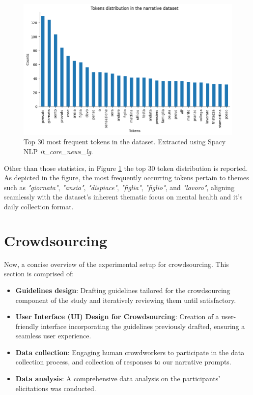 \begin{figure}[!htbp]
    \centering
    \includegraphics[width=1\linewidth]{assets//imgs/dataset-top-30-prompt.png}
    \caption{Top 30 most frequent tokens in the dataset. Extracted using Spacy NLP \textit{it\_core\_news\_lg}.}
    \label{fig:dataset-top-30-prompt}
\end{figure}

Other than those statistics, in Figure \ref{fig:dataset-top-30-prompt} the top 30 token distribution is reported. As depicted in the figure, the most frequently occurring tokens pertain to themes such as  \emph{"giornata"}, \emph{"ansia"},  \emph{"dispiace"},  \emph{"figlia"},  \emph{"figlio"}, and  \emph{"lavoro"}, aligning seamlessly with the dataset's inherent thematic focus on mental health and it's daily collection format.

\section{Crowdsourcing}
Now, a concise overview of the experimental setup for crowdsourcing. This section is comprised of:
\begin{itemize}
    \item \textbf{Guidelines design}: Drafting guidelines tailored for the crowdsourcing component of the study and iteratively reviewing them until satisfactory.
    \item \textbf{User Interface (UI) Design for Crowdsourcing}: Creation of a user-friendly interface incorporating the guidelines previously drafted, ensuring a seamless user experience.
    \item \textbf{Data collection}: Engaging human crowdworkers to participate in the data collection process, and collection of responses to our narrative prompts.
    \item \textbf{Data analysis}: A comprehensive data analysis on the participants' elicitations was conducted.
\end{itemize}
